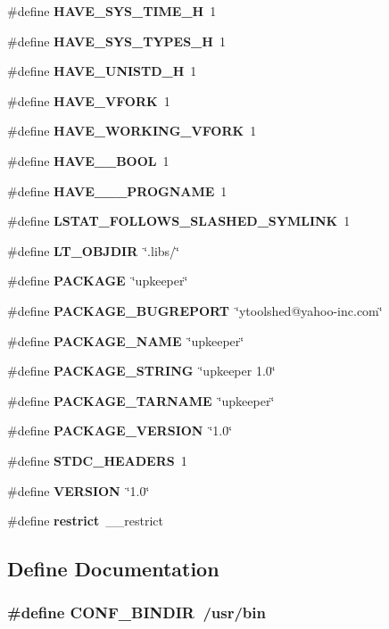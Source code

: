 \begin{DoxyCompactItemize}
\item 
\#define {\bf HAVE\_\-SYS\_\-TIME\_\-H}~1
\item 
\#define {\bf HAVE\_\-SYS\_\-TYPES\_\-H}~1
\item 
\#define {\bf HAVE\_\-UNISTD\_\-H}~1
\item 
\#define {\bf HAVE\_\-VFORK}~1
\item 
\#define {\bf HAVE\_\-WORKING\_\-VFORK}~1
\item 
\#define {\bf HAVE\_\-\_\-BOOL}~1
\item 
\#define {\bf HAVE\_\-\_\-\_\-PROGNAME}~1
\item 
\#define {\bf LSTAT\_\-FOLLOWS\_\-SLASHED\_\-SYMLINK}~1
\item 
\#define {\bf LT\_\-OBJDIR}~\char`\"{}.libs/\char`\"{}
\item 
\#define {\bf PACKAGE}~\char`\"{}upkeeper\char`\"{}
\item 
\#define {\bf PACKAGE\_\-BUGREPORT}~\char`\"{}ytoolshed@yahoo-\/inc.com\char`\"{}
\item 
\#define {\bf PACKAGE\_\-NAME}~\char`\"{}upkeeper\char`\"{}
\item 
\#define {\bf PACKAGE\_\-STRING}~\char`\"{}upkeeper 1.0\char`\"{}
\item 
\#define {\bf PACKAGE\_\-TARNAME}~\char`\"{}upkeeper\char`\"{}
\item 
\#define {\bf PACKAGE\_\-VERSION}~\char`\"{}1.0\char`\"{}
\item 
\#define {\bf STDC\_\-HEADERS}~1
\item 
\#define {\bf VERSION}~\char`\"{}1.0\char`\"{}
\item 
\#define {\bf restrict}~\_\-\_\-restrict
\end{DoxyCompactItemize}


\subsection{Define Documentation}
\subsubsection[{CONF\_\-BINDIR}]{\setlength{\rightskip}{0pt plus 5cm}\#define CONF\_\-BINDIR~/usr/bin}\label{upkeeper__config_8h_aa2d32a8ea3ca35354e0b1537b02d6f09}
